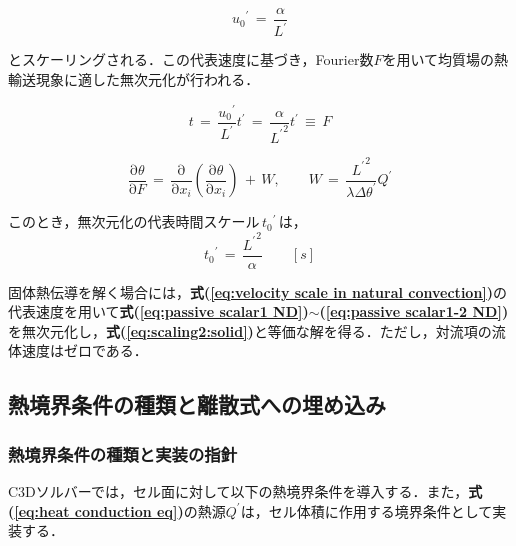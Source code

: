 \begin{equation}
{u_{\mathit{0}}}^{\prime} \,= \,\frac{\alpha}{L^{\prime}}
\label{eq:velocity scale in natural convection}
\end{equation}

\noindent とスケーリングされる．この代表速度に基づき，Fourier数$F$を用いて均質場の熱輸送現象に適した無次元化が行われる．

\begin{equation}
{t} \,=\, \frac{{u_{\mathit{0}}}^{\prime}} {L^{\prime}}{t}^{\prime}
\,=\,
\frac{\alpha} {{L^{\prime}}^{2}} t^{\prime} \, \equiv\, {F}
\label{eq:scaling1:solid}
\end{equation}

\begin{equation}
\frac{\mathrm{\partial}\mathit{\theta}}{\mathrm{\partial}{F}}\,=\,\frac{\mathrm{\partial}}{\mathrm{\partial}{x}_{i}}\left({\frac{\mathrm{\partial}\mathit{\theta}}{\mathrm{\partial}{x}_{i}}}\right) \,+\, {W}{\mathrm{,}}\qquad
{W} \,=\, \frac{{L^{\prime}}^{2}}{\lambda \Delta \theta^{\prime}} Q^{\prime}
\label{eq:scaling2:solid}
\end{equation}

\noindent このとき，無次元化の代表時間スケール$\,{t_{0}}^{\prime}\,$は，
\begin{equation}
{t_{0}}^{\prime} \,=\, \frac{{L^{\prime}}^{2}}{\alpha} \qquad [s]
\label{eq:scaling1:time}
\end{equation}

\noindent 固体熱伝導を解く場合には，\textbf{式(\ref{eq:velocity scale in natural convection})}の代表速度を用いて\textbf{式(\ref{eq:passive scalar1 ND})}$\sim$\textbf{(\ref{eq:passive scalar1-2 ND})}を無次元化し，\textbf{式(\ref{eq:scaling2:solid})}と等価な解を得る．ただし，対流項の流体速度はゼロである．


%
\subsection{熱境界条件の種類と離散式への埋め込み}
\label{sec:heat_boundary}
%
\subsubsection{熱境界条件の種類と実装の指針}
C3Dソルバーでは，セル面に対して以下の熱境界条件を導入する．また，\textbf{式(\ref{eq:heat conduction eq})}の熱源$Q^{\prime}$は，セル体積に作用する境界条件として実装する．


